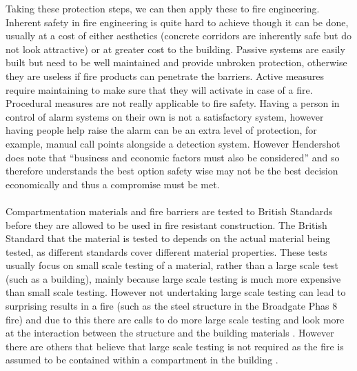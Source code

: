 \documentclass[table,a4paper,oneside]{book}
\begin{document}
Taking these protection steps, we can then apply these to fire engineering. Inherent safety in fire engineering is quite hard to achieve though it can be done, usually at a cost of either aesthetics (concrete corridors are inherently safe but do not look attractive) or at greater cost to the building. Passive systems are easily built but need to be well maintained and provide unbroken protection, otherwise they are useless if fire products can penetrate the barriers. Active measures require maintaining to make sure that they will activate in case of a fire. Procedural measures are not really applicable to fire safety. Having a person in control of alarm systems on their own is not a satisfactory system, however having people help raise the alarm can be an extra level of protection, for example, manual call points alongside a detection system. However Hendershot does note that ``business and economic factors must also be considered'' and so therefore understands the best option safety wise may not be the best decision economically and thus a compromise must be met.
\\
\\
Compartmentation materials and fire barriers are tested to British Standards before they are allowed to be used in fire resistant construction. The British Standard that the material is tested to depends on the actual material being tested, as different standards cover different material properties. These tests usually focus on small scale testing of a material, rather than a large scale test (such as a building), mainly because large scale testing is much more expensive than small scale testing. However not undertaking large scale testing can lead to surprising results in a fire (such as the steel structure in the Broadgate Phas 8 fire) and due to this there are calls to do more large scale testing and look more at the interaction between the structure and the building materials \citep{ZhaohuiHuang2001,Lamont2006}. However there are others that believe that large scale testing is not required as the fire is assumed to be contained within a compartment in the building \citep{Nadjai2006}.
\\
\\
\end{document}
